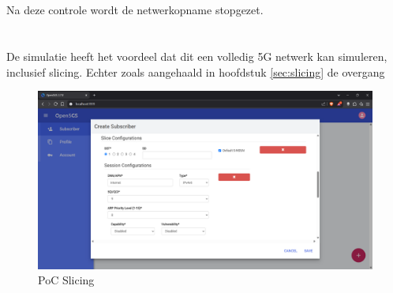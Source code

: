 \subsection{}%
\label{sec:Test-curl}%

Na deze controle wordt de netwerkopname stopgezet.

\section{}%
\label{sec:addFeature}%

De simulatie heeft het voordeel dat dit een volledig 5G netwerk kan simuleren, inclusief slicing. Echter zoals aangehaald in hoofdstuk \ref{sec:slicing} de overgang 


\begin{figure}[H]
    \includegraphics[width=\linewidth]{../graphics/POC-Slicing.png}
    \caption{PoC Slicing}
    \label{fig:pocSlicing}
\end{figure}

\section{}%
\label{sec:integrations}%

